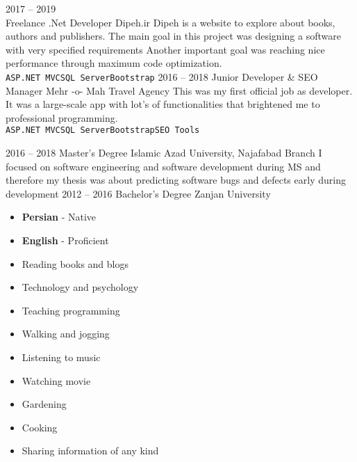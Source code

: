 \documentclass[a4paper]{developercv} %
\begin{document}
\begin{entrylist}
	\entry
	{2017 -- 2019\\\footnotesize{Freelance}}
	{.Net Developer}
	{Dipeh.ir}
	{Dipeh is a website to explore about books, authors and publishers. The main goal in this project was designing a software with very specified requirements Another important goal was reaching nice performance through maximum code optimization.
		\\\texttt{ASP.NET MVC}\slashsep\texttt{SQL Server}\slashsep\texttt{Bootstrap}}
	\entry
	{2016 -- 2018}
	{Junior Developer \& SEO Manager}
	{Mehr -o- Mah Travel Agency}
	{This was my first official job as developer. It was a large-scale app with lot's of functionalities that brightened me to professional programming.
		\\\texttt{ASP.NET MVC}\slashsep\texttt{SQL Server}\slashsep\texttt{Bootstrap}\slashsep\texttt{SEO Tools}}
\end{entrylist}



\begin{entrylist}
	\entry
	{2016 -- 2018}
	{Master's Degree}
	{Islamic Azad University, Najafabad Branch}
	{I focused on software engineering and software development during MS and therefore my thesis was about predicting software bugs and defects early during development}
	\entry
	{2012 -- 2016}
	{Bachelor's Degree}
	{Zanjan University}
	{}
\end{entrylist}


\begin{itemize}
	\setlength\itemsep{3px}
	\item \textbf{Persian} - Native
	\item \textbf{English} - Proficient
\end{itemize}


\begin{itemize}
	\item Reading books and blogs
	\item Technology and psychology
	\item Teaching programming
	\item Walking and jogging
	\item Listening to music
	\item Watching movie
	\item Gardening
	\item Cooking
	\item Sharing information of any kind
\end{itemize}

\end{document}
